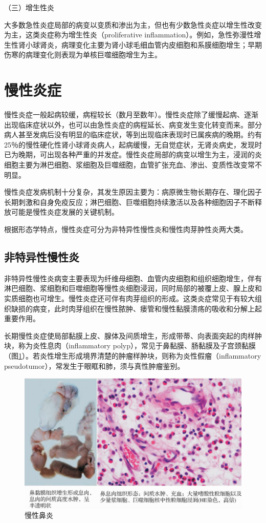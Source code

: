 {（三）增生性炎}

大多数急性炎症局部的病变以变质和渗出为主，但也有少数急性炎症以增生性改变为主，这类炎症称为增生性炎（proliferative
inflammation）。例如，急性弥漫性增生性肾小球肾炎，病理变化主要为肾小球毛细血管内皮细胞和系膜细胞增生；早期伤寒的病理变化则表现为单核巨噬细胞增生为主。

\section{慢性炎症}

慢性炎症一般起病较缓，病程较长（数月至数年）。慢性炎症除了缓慢起病、逐渐出现临床症状以外，也可以由急性炎症的病程延长、病变发生变化转变而来。部分病人甚至发病后没有明显的临床症状，等到出现临床表现时已属疾病的晚期。约有25％的慢性硬化性肾小球肾炎病人，起病缓慢，无自觉症状，无肾炎病史，发现时已为晚期，可出现各种严重的并发症。慢性炎症局部的病变以增生为主，浸润的炎细胞主要为淋巴细胞、浆细胞及巨噬细胞，血管扩张充血、渗出、变质性改变常不明显。

慢性炎症发病机制十分复杂，其发生原因主要为：病原微生物长期存在、理化因子长期刺激和自身免疫反应；淋巴细胞、巨噬细胞持续激活以及各种细胞因子不断释放可能是慢性炎症发展的关键机制。

根据形态学特点，慢性炎症可分为非特异性慢性炎和慢性肉芽肿性炎两大类。

\subsection{非特异性慢性炎}

非特异性慢性炎病变主要表现为纤维母细胞、血管内皮细胞和组织细胞增生，伴有淋巴细胞、浆细胞和巨噬细胞等慢性炎细胞浸润，同时局部的被覆上皮、腺上皮和实质细胞也可增生。慢性炎症还可伴有肉芽组织的形成。这类炎症常见于有较大组织缺损的病变，此时肉芽组织在慢性脓肿、瘘管和慢性黏膜溃疡的吸收和分解上起重要作用。

长期慢性炎症使局部黏膜上皮、腺体及间质增生，形成带蒂、向表面突起的肉样肿块，称为炎性息肉（inflammatory
polyp），常见于鼻黏膜、肠黏膜及子宫颈黏膜（图\ref{fig4-12}）。若炎性增生形成境界清楚的肿瘤样肿块，则称为炎性假瘤（inflammatory
pseudotumor），常发生于眼眶和肺，须与真性肿瘤鉴别。

\begin{figure}[!htbp]
 \centering
 \includegraphics{./images/Image00063.jpg}
 \caption{慢性鼻炎}
 \label{fig4-12}
  \end{figure} 

